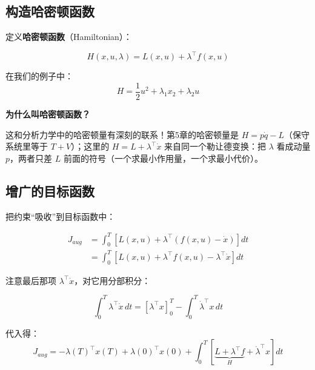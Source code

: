 \subsection{构造哈密顿函数}

定义\textbf{哈密顿函数}（Hamiltonian）：

\begin{keyformula}[title=哈密顿函数]
\begin{equation}
H(x, u, \lambda) = L(x, u) + \lambda^\top f(x, u)
\end{equation}

在我们的例子中：
\begin{equation}
H = \frac{1}{2}u^2 + \lambda_1 x_2 + \lambda_2 u
\end{equation}
\end{keyformula}

\textbf{为什么叫哈密顿函数？}

这和分析力学中的哈密顿量有深刻的联系！第5章的哈密顿量是 $H = p\dot{q} - L$（保守系统里等于 $T + V$）；这里的 $H = L + \lambda^\top \dot{x}$ 来自同一个勒让德变换：把 $\lambda$ 看成动量 $p$，两者只差 $L$ 前面的符号（一个求最小作用量，一个求最小代价）。

\subsection{增广的目标函数}

把约束“吸收”到目标函数中：

\begin{align}
J_{aug} &= \int_0^T \left[ L(x, u) + \lambda^\top (f(x, u) - \dot{x}) \right] dt \\
&= \int_0^T \left[ L(x, u) + \lambda^\top f(x, u) - \lambda^\top \dot{x} \right] dt
\end{align}

注意最后那项 $\lambda^\top \dot{x}$，对它用分部积分：

\[
\int_0^T \lambda^\top \dot{x} \, dt = [\lambda^\top x]_0^T - \int_0^T \dot{\lambda}^\top x \, dt
\]

代入得：
\begin{equation}
J_{aug} = -\lambda(T)^\top x(T) + \lambda(0)^\top x(0) + \int_0^T \left[ \underbrace{L + \lambda^\top f}_{H} + \dot{\lambda}^\top x \right] dt
\end{equation}

